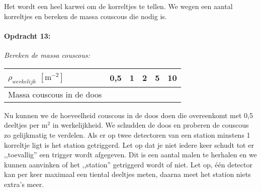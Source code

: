 \bigskip{}
Het wordt een heel karwei om de korreltjes te tellen. We wegen een
aantal korreltjes en bereken de massa couscous die nodig is.

\begin{minipage}[t]{1\columnwidth}%

\paragraph{Opdracht 13:}

\textit{Bereken de massa couscous:}

\bigskip{}

\begin{tabular}{|x{.3\textwidth}|x{.1\textwidth}|x{.1\textwidth}
                |x{.1\textwidth}|x{.1\textwidth}|x{.1\textwidth}|}
\hline 
$\rho_{werkelijk}$ $\left[\mathrm{m^{-2}}\right]$ & 0,5 & 1 & 2 & 5 & 10 \\
\hline 
Massa couscous in de doos &  &  &  &  & \\
\hline 
\end{tabular}%
\end{minipage}

\bigskip{}


Nu kunnen we de hoeveelheid couscous in de doos doen die overeenkomt
met 0,5 deeltjes per $\mathrm{m^{2}}$ in werkelijkheid. We schudden
de doos en proberen de couscous zo gelijkmatig te verdelen. Als er
op twee detectoren van een station minstens 1 korreltje ligt is het
station getriggerd. Let op dat je niet iedere keer schudt tot er ,,toevallig''
een trigger wordt afgegeven. Dit is een aantal malen te herhalen en
we kunnen aanvinken of het ,,station'' getriggerd wordt of niet.
Let op, één detector kan per keer maximaal een tiental deeltjes meten,
daarna meet het station niets extra's meer.

